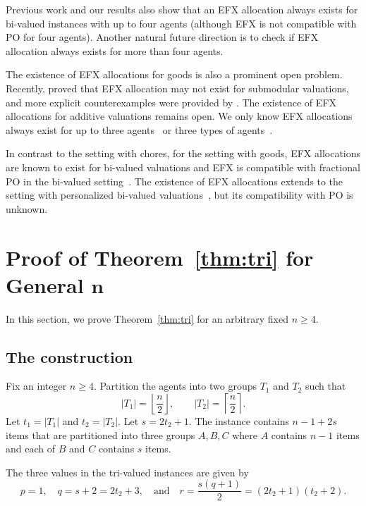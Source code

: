 \documentclass{article}
\theoremstyle{definition}
\begin{document}
Previous work and our results also show that an EFX allocation always exists for bi-valued instances with up to four agents (although EFX is not compatible with PO for four agents).
Another natural future direction is to check if EFX allocation always exists for more than four agents.

The existence of EFX allocations for goods is also a prominent open problem.
Recently, \citet{akrami2026counterexample} proved that EFX allocation may not exist for submodular valuations, and more explicit counterexamples were provided by
\citet{mackenzie2026counterexamples}.
The existence of EFX allocations for additive valuations remains open.
We only know EFX allocations always exist for up to three agents~\citep{chaudhury2024efx,akrami2025efx} or three types of agents~\citep{hv2025efx}.

In contrast to the setting with chores, for the setting with goods, EFX allocations are known to exist for bi-valued valuations and EFX is compatible with fractional PO in the bi-valued setting~\citep{amanatidis2021maximum,bu2024best}.
The existence of EFX allocations extends to the setting with personalized bi-valued valuations~\citep{jin2025pareto,byrka2026probing}, but its compatibility with PO is unknown.





\newpage
\appendix

\section{Proof of Theorem~\ref{thm:tri} for General $\boldsymbol{n}$}
\label{append:tri-n}
In this section, we prove Theorem~\ref{thm:tri} for an arbitrary fixed $n\geq 4$.

\subsection{The construction}
Fix an integer $n\ge 4$. Partition the agents into two groups $T_1$ and $T_2$ such that
\[
    |T_1|=\left\lfloor \frac n2\right\rfloor,
    \qquad
    |T_2|=\left\lceil \frac n2\right\rceil.
\]
Let $t_1=|T_1|$ and $t_2=|T_2|$.
Let $s=2t_2+1$.
The instance contains $n-1+2s$ items that are partitioned into three groups $A,B,C$ where $A$ contains $n-1$ items and each of $B$ and $C$ contains $s$ items.

The three values in the tri-valued instances are given by
$$p=1,\quad q=s+2=2t_2+3,\quad\mbox{and}\quad r=\frac{s(q+1)}2=(2t_2+1)(t_2+2).$$
\end{document}
